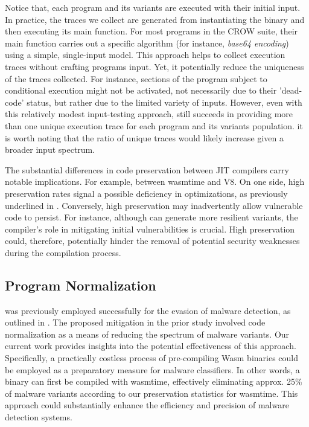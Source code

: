 Notice that, each program and its variants are executed with their initial input.
In practice, the traces we collect are generated from instantiating the \wasm binary and then executing its main function. 
For most programs in the CROW suite, their main function carries out a specific algorithm (for instance, \emph{base64 encoding}) using a simple, single-input model. 
This approach helps to collect execution traces without crafting programs input.
Yet, it potentially reduce the uniqueness of the traces collected. 
For instance, sections of the program subject to conditional execution might not be activated, not necessarily due to their 'dead-code' status, but rather due to the limited variety of inputs. 
However, even with this relatively modest input-testing approach, \tool still succeeds in providing more than one unique execution trace for each program and its variants population.
it is worth noting that the ratio of unique traces would likely increase given a broader input spectrum.


The substantial differences in code preservation between JIT compilers carry notable implications. 
For example, between wasmtime and V8.
On one side, high preservation rates signal a possible deficiency in optimizations, as previously underlined in \cite{wasmslim}. 
Conversely, high preservation may inadvertently allow vulnerable code to persist.
For instance, although \tool can generate more resilient variants, the compiler's role in mitigating initial vulnerabilities is crucial. 
High preservation could, therefore, potentially hinder the removal of potential security weaknesses during the compilation process.


\subsection{Program Normalization}
\tool was previously employed successfully for the evasion of malware detection, as outlined in \cite{CABRERAARTEAGA2023103296}. 
The proposed mitigation in the prior study involved code normalization as a means of reducing the spectrum of malware variants. 
Our current work provides insights into the potential effectiveness of this approach. 
Specifically, a practically costless process of pre-compiling Wasm binaries could be employed as a preparatory measure for malware classifiers. 
In other words, a \wasm binary can first be compiled with wasmtime, effectively eliminating approx. 25\% of malware variants according to our preservation statistics for wasmtime. 
This approach could substantially enhance the efficiency and precision of malware detection systems.


